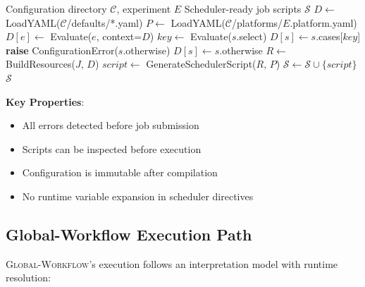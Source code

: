 \documentclass[11pt,twoside]{article}
\newcommand{\crow}{\textsc{CROW}}
\newcommand{\gw}{\textsc{Global-Workflow}}
\begin{document}
\begin{algorithm}[H]
\caption{\crow{} Configuration Resolution}
\label{alg:crow-exec}
\begin{algorithmic}[1]
\REQUIRE Configuration directory $\mathcal{C}$, experiment $E$
\ENSURE Scheduler-ready job scripts $\mathcal{S}$
\STATE $D \gets$ LoadYAML($\mathcal{C}$/defaults/*.yaml) 
\STATE $P \gets$ LoadYAML($\mathcal{C}$/platforms/$E$.platform.yaml)
    \STATE $D[e] \gets$ Evaluate($e$, context=$D$) 
\ENDFOR
{}
    \STATE $key \gets$ Evaluate($s$.select)
        \STATE $D[s] \gets s$.cases[$key$]
        \STATE \textbf{raise} ConfigurationError($s$.otherwise)
    \ELSE
        \STATE $D[s] \gets s$.otherwise
    \ENDIF
\ENDFOR {}
    \STATE $R \gets$ BuildResources($J$, $D$)
    \STATE $script \gets$ GenerateSchedulerScript($R$, $P$)
    \STATE $\mathcal{S} \gets \mathcal{S} \cup \{script\}$
\ENDFOR {}
\RETURN $\mathcal{S}$
\end{algorithmic}
\end{algorithm}

\textbf{Key Properties}:
\begin{itemize}[leftmargin=2em,noitemsep,topsep=2pt]
    \item All errors detected before job submission
    \item Scripts can be inspected before execution
    \item Configuration is immutable after compilation
    \item No runtime variable expansion in scheduler directives
\end{itemize}

\subsection{Global-Workflow Execution Path}

\gw{}'s execution follows an interpretation model with runtime resolution:
\end{document}
